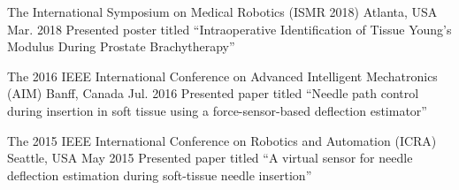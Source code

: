 
\begin{cventries}

  \cvpres
    {The International Symposium on Medical Robotics (ISMR 2018)} %
    {Atlanta, USA} %
    {Mar. 2018} %
    {Presented poster titled ``Intraoperative Identification of Tissue Young’s Modulus During Prostate Brachytherapy''}

  \cvpres
    {The 2016 IEEE International Conference on Advanced Intelligent Mechatronics (AIM)} %
    {Banff, Canada} %
    {Jul. 2016} %
    {Presented paper titled ``Needle path control during insertion in soft tissue using a force-sensor-based deflection estimator''}

  \cvpres
    {The 2015 IEEE International Conference on Robotics and Automation (ICRA)} %
    {Seattle, USA} %
    {May 2015} %
    {Presented paper titled ``A virtual sensor for needle deflection estimation during soft-tissue needle insertion''}

\end{cventries}
